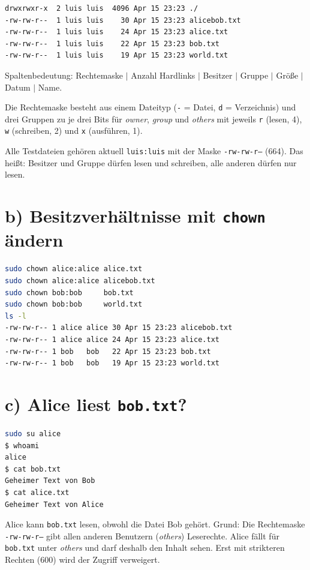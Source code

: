 \documentclass[
	fontsize=12pt,
	paper=a4,
	numbers=noenddot,
	listof=totoc,
	listof=entryprefix,
	listof=nochaptergap,
	bibliography=totoc,
	parskip=half,
	openany
]{scrbook}
\begin{document}
\begin{lstlisting}[language=bash]
drwxrwxr-x  2 luis luis  4096 Apr 15 23:23 ./
-rw-rw-r--  1 luis luis    30 Apr 15 23:23 alicebob.txt
-rw-rw-r--  1 luis luis    24 Apr 15 23:23 alice.txt
-rw-rw-r--  1 luis luis    22 Apr 15 23:23 bob.txt
-rw-rw-r--  1 luis luis    19 Apr 15 23:23 world.txt
\end{lstlisting}

Spaltenbedeutung: Rechtemaske $\vert$ Anzahl Hardlinks $\vert$ Besitzer $\vert$ Gruppe $\vert$ Größe $\vert$ Datum $\vert$ Name.

Die Rechtemaske besteht aus einem Dateityp (\texttt{-} = Datei, \texttt{d} = Verzeichnis) und drei Gruppen zu je drei Bits für \emph{owner}, \emph{group} und \emph{others} mit jeweils \texttt{r} (lesen, 4), \texttt{w} (schreiben, 2) und \texttt{x} (ausführen, 1).

Alle Testdateien gehören aktuell \texttt{luis:luis} mit der Maske \texttt{-rw-rw-r--} (664).
Das heißt: Besitzer und Gruppe dürfen lesen und schreiben, alle anderen dürfen nur lesen.

\section*{b) Besitzverhältnisse mit \texttt{chown} ändern}

\begin{lstlisting}[language=bash]
sudo chown alice:alice alice.txt
sudo chown alice:alice alicebob.txt
sudo chown bob:bob     bob.txt
sudo chown bob:bob     world.txt
ls -l
-rw-rw-r-- 1 alice alice 30 Apr 15 23:23 alicebob.txt
-rw-rw-r-- 1 alice alice 24 Apr 15 23:23 alice.txt
-rw-rw-r-- 1 bob   bob   22 Apr 15 23:23 bob.txt
-rw-rw-r-- 1 bob   bob   19 Apr 15 23:23 world.txt
\end{lstlisting}

\section*{c) Alice liest \texttt{bob.txt}?}

\begin{lstlisting}[language=bash]
sudo su alice
$ whoami
alice
$ cat bob.txt
Geheimer Text von Bob
$ cat alice.txt
Geheimer Text von Alice
\end{lstlisting}

Alice kann \texttt{bob.txt} lesen, obwohl die Datei Bob gehört.
Grund: Die Rechtemaske \texttt{-rw-rw-r--} gibt allen anderen Benutzern (\emph{others}) Leserechte.
Alice fällt für \texttt{bob.txt} unter \emph{others} und darf deshalb den Inhalt sehen.
Erst mit strikteren Rechten (600) wird der Zugriff verweigert.
\end{document}
